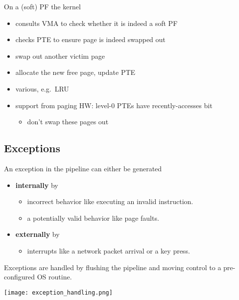 On a (soft) PF the kernel
\begin{itemize}
    \item consults VMA to check whether it is indeed a soft PF
    \item checks PTE to ensure page is indeed swapped out
    \item swap out another victim page
    \item allocate the new free page, update PTE
\end{itemize}

\newpar{}

\begin{itemize}
    \item various, e.g.\ LRU
    \item support from paging HW: level-0 PTEs have recently-accesses bit
    \begin{itemize}
        \item don't swap these pages out
    \end{itemize}
\end{itemize}

\subsection{Exceptions}\label{exceptions}
An exception in the pipeline can either be generated
\begin{itemize}
    \item \textbf{internally} by
          \begin{itemize}
              \item incorrect behavior like executing an invalid instruction.
              \item a potentially valid behavior like page faults.
          \end{itemize}
    \item \textbf{externally} by
          \begin{itemize}
              \item interrupts like a network packet arrival or a key press.
          \end{itemize}
\end{itemize}

Exceptions are handled by flushing the pipeline and moving control to a pre-configured OS routine.

\begin{center}
    \texttt{[image: exception\_handling.png]}
\end{center}

